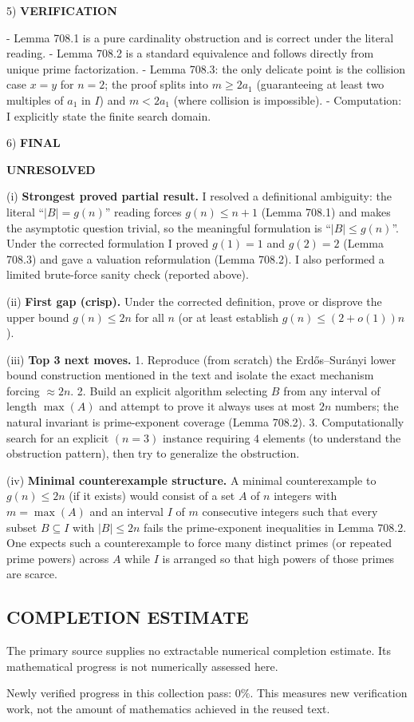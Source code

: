 5) \textbf{VERIFICATION}

- Lemma 708.1 is a pure cardinality obstruction and is correct under the literal reading.
- Lemma 708.2 is a standard equivalence and follows directly from unique prime factorization.
- Lemma 708.3: the only delicate point is the collision case $x=y$ for $n=2$; the proof splits into $m\ge 2a_1$ (guaranteeing at least two multiples of $a_1$ in $I$) and $m<2a_1$ (where collision is impossible).
- Computation: I explicitly state the finite search domain.

6) \textbf{FINAL}

\textbf{UNRESOLVED}

(i) \textbf{Strongest proved partial result.}
I resolved a definitional ambiguity: the literal ``$|B|=g(n)$'' reading forces $g(n)\le n+1$ (Lemma 708.1) and makes the asymptotic question trivial, so the meaningful formulation is ``$|B|\le g(n)$''. Under the corrected formulation I proved $g(1)=1$ and $g(2)=2$ (Lemma 708.3) and gave a valuation reformulation (Lemma 708.2). I also performed a limited brute-force sanity check (reported above).

(ii) \textbf{First gap (crisp).}
Under the corrected definition, prove or disprove the upper bound $g(n)\le 2n$ for all $n$ (or at least establish $g(n)\le (2+o(1))n$).

(iii) \textbf{Top 3 next moves.}
1. Reproduce (from scratch) the Erd\H{o}s--Sur\'anyi lower bound construction mentioned in the text and isolate the exact mechanism forcing $\approx 2n$.
2. Build an explicit algorithm selecting $B$ from any interval of length $\max(A)$ and attempt to prove it always uses at most $2n$ numbers; the natural invariant is prime-exponent coverage (Lemma 708.2).
3. Computationally search for an explicit $(n=3)$ instance requiring $4$ elements (to understand the obstruction pattern), then try to generalize the obstruction.

(iv) \textbf{Minimal counterexample structure.}
A minimal counterexample to $g(n)\le 2n$ (if it exists) would consist of a set $A$ of $n$ integers with $m=\max(A)$ and an interval $I$ of $m$ consecutive integers such that every subset $B\subseteq I$ with $|B|\le 2n$ fails the prime-exponent inequalities in Lemma 708.2. One expects such a counterexample to force many distinct primes (or repeated prime powers) across $A$ while $I$ is arranged so that high powers of those primes are scarce.




\subsection*{COMPLETION ESTIMATE}
The primary source supplies no extractable numerical completion estimate. Its mathematical progress is not numerically assessed here.

Newly verified progress in this collection pass: $0\%$. This measures new verification work, not the amount of mathematics achieved in the reused text.
